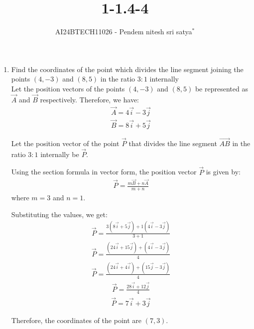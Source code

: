 \documentclass[journal]{IEEEtran}
\begin{document}

\vspace{3cm}


\title{1-1.4-4}
\author{AI24BTECH11026 - Pendem nitesh sri satya$^{*}$%
}
\maketitle
\begin{enumerate}
    \item Find the coordinates of the point which divides the line segment joining the points $(4,-3)$ and $(8,5)$ in the ratio $3:1$ internally\\
\solution
Let the position vectors of the points \((4, -3)\) and \((8, 5)\) be represented as \(\vec{A}\) and \(\vec{B}\) respectively. Therefore, we have:
\begin{align}
\vec{A} = 4\vec{i} - 3\vec{j}
\end{align}
\begin{align}
\vec{B} = 8\vec{i} + 5\vec{j}
\end{align}

Let the position vector of the point \(\vec{P}\) that divides the line segment \(\vec{AB}\) in the ratio \(3:1\) internally be \(\vec{P}\).

Using the section formula in vector form, the position vector \(\vec{P}\) is given by:
\begin{align}
\vec{P} = \frac{m\vec{B} + n\vec{A}}{m+n}
\end{align}
where \(m = 3\) and \(n = 1\).

Substituting the values, we get:
\begin{align}
\vec{P} = \frac{3(8\vec{i} + 5\vec{j}) + 1(4\vec{i} - 3\vec{j})}{3+1}
\end{align}
\begin{align}
\vec{P} = \frac{(24\vec{i} + 15\vec{j}) + (4\vec{i} - 3\vec{j})}{4}
\end{align}
\begin{align}
\vec{P} = \frac{(24\vec{i} + 4\vec{i}) + (15\vec{j} - 3\vec{j})}{4}
\end{align}
\begin{align}
\vec{P} = \frac{28\vec{i} + 12\vec{j}}{4}
\end{align}
\begin{align}
\vec{P} = 7\vec{i} + 3\vec{j}
\end{align}

Therefore, the coordinates of the point are \((7, 3)\).
\end{enumerate}
\end{document}
